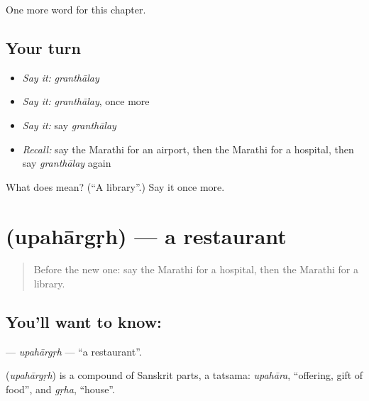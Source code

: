 \begin{grammarlens}[title={What you've built}]
One more word for this chapter.
\end{grammarlens}

\subsection*{Your turn}
\begin{itemize}
\raggedright
  \item \emph{Say it:} \emph{granthālay}
  \item \emph{Say it:} \emph{granthālay}, once more
  \item \emph{Say it:} say \emph{granthālay}
  \item \emph{Recall:} say the Marathi for an airport, then the Marathi for a hospital, then say \emph{granthālay} again
\end{itemize}

\begin{tcolorbox}[breakable,colback=teal!4,colframe=teal!35!black,title={Before you move on}]
What does  mean? (\textquotedblleft{}A library\textquotedblright{}.) Say it once more.
\end{tcolorbox}
\section[\texorpdfstring{\mr{उपहारगृह} (upahārgṛh)}{उपहारगृह (upahārgṛh)}]{ (upahārgṛh) — a restaurant}

\label{lesson:MR-C129-upahargrh}



\begin{quote}
Before the new one: say the Marathi for a hospital, then the Marathi for a library.
\end{quote}

\subsection*{You'll want to know: }
\textbf{} — \emph{upahārgṛh} — \textquotedblleft{}a restaurant\textquotedblright{}.

\begin{cousinweb}
\textbf{} (\emph{upahārgṛh}) is a compound of Sanskrit parts, a tatsama: \emph{upahāra}, \textquotedblleft{}offering, gift of food\textquotedblright{}, and \emph{gṛha}, \textquotedblleft{}house\textquotedblright{}.
\end{cousinweb}

